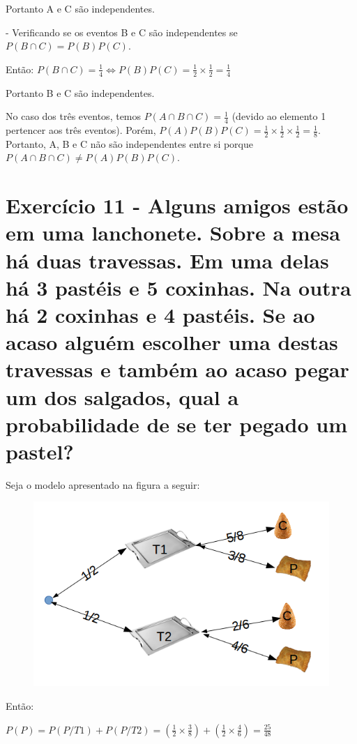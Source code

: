\documentclass[12pt]{article}
\begin{document}
Portanto A e C são independentes.

- Verificando se os eventos B e C são independentes se $\displaystyle P(B \cap C)=P(B)P(C)$.

Então: $\displaystyle P(B \cap C)=\frac{1}{4} \Longleftrightarrow P(B)P(C)=\frac{1}{2} \times \frac{1}{2} =\frac{1}{4}$

Portanto B e C são independentes.

No caso dos três eventos, temos $\displaystyle P(A \cap B \cap C)=\frac{1}{4}$ (devido ao elemento 1 pertencer aos três eventos). Porém, $\displaystyle P(A)P(B)P(C)=\frac{1}{2} \times \frac{1}{2} \times \frac{1}{2} = \frac{1}{8}$. Portanto, A, B e C não são independentes entre si porque $\displaystyle P(A \cap B \cap C) \neq P(A)P(B)P(C)$.

\section*{Exercício 11 - Alguns amigos estão em uma lanchonete. Sobre a mesa há duas travessas. Em uma delas há 3 pastéis e 5 coxinhas. Na outra há 2 coxinhas e 4 pastéis. Se ao acaso alguém escolher uma destas travessas e também ao acaso pegar um dos salgados, qual a probabilidade de se ter pegado um pastel?}

Seja o modelo apresentado na figura a seguir:

\begin{figure}[H]
\centering\includegraphics[width=0.6\paperwidth]{coxinha.png}
\end{figure}

Então:

$\displaystyle P(P)=P(P/T1)+P(P/T2)=(\frac{1}{2} \times \frac{3}{8})+(\frac{1}{2} \times \frac{4}{6})=\frac{25}{48}$
\end{document}
